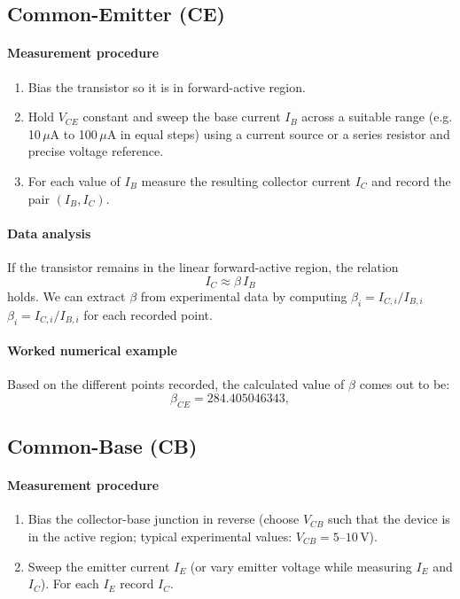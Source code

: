 \documentclass[12pt,a4paper]{article}
\begin{document}
\subsection{Common-Emitter (CE)}
\paragraph{Measurement procedure}
\begin{enumerate}
  \item Bias the transistor so it is in forward-active region.
  \item Hold $V_{CE}$ constant and sweep the base current $I_B$ across a suitable range (e.g. 10\,$\mu$A to 100\,$\mu$A in equal steps) using a current source or a series resistor and precise voltage reference.
  \item For each value of $I_B$ measure the resulting collector current $I_C$ and record the pair $(I_B,I_C)$.
\end{enumerate}

\paragraph{Data analysis}
If the transistor remains in the linear forward-active region, the relation
\begin{equation}
  I_C \approx \beta\,I_B
\end{equation}
holds. We can extract $\beta$ from experimental data by computing $\beta_i = I_{C,i}/I_{B,i}$ $\beta_i = I_{C,i}/I_{B,i}$ for each recorded point.

\paragraph{Worked numerical example}
Based on the different points recorded, the calculated value of $\beta$ comes out to be:
\begin{equation*}
  \beta_{CE} = 284.405046343,
\end{equation*}

\subsection{Common-Base (CB)}
\paragraph{Measurement procedure}
\begin{enumerate}
  \item Bias the collector-base junction in reverse (choose $V_{CB}$ such that the device is in the active region; typical experimental values: $V_{CB}=5$--$10\,$V).
  \item Sweep the emitter current $I_E$ (or vary emitter voltage while measuring $I_E$ and $I_C$). For each $I_E$ record $I_C$.
\end{enumerate}
\end{document}
